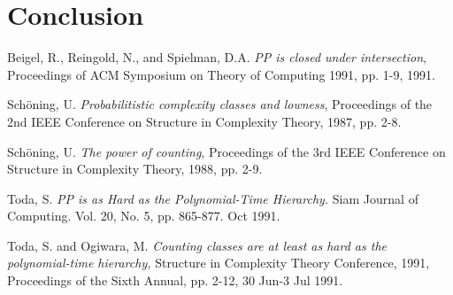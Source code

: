 \documentclass[11pt]{article}
\begin{document}
\section{Conclusion}

\pagebreak

\begin{thebibliography}{9}

 Beigel, R., Reingold, N., and Spielman, D.A. \emph{PP is closed under intersection}, Proceedings of ACM Symposium on Theory of Computing 1991, pp. 1-9, 1991.

 Sch\"oning, U. \emph{Probabilitistic complexity classes and lowness}, Proceedings of the 2nd IEEE Conference on Structure in Complexity Theory, 1987, pp. 2-8.

 Sch\"oning, U. \emph{The power of counting}, Proceedings of the 3rd IEEE Conference on Structure in Complexity Theory, 1988, pp. 2-9.

Toda, S. \emph{PP is as Hard as the Polynomial-Time Hierarchy.} Siam Journal of Computing. Vol. 20, No. 5, pp. 865-877. Oct 1991.

 Toda, S. and Ogiwara, M. \emph{Counting classes are at least as hard as the polynomial-time hierarchy,} Structure in Complexity Theory Conference, 1991, Proceedings of the Sixth Annual, pp. 2-12, 30 Jun-3 Jul 1991.

\end{thebibliography}
\end{document}
